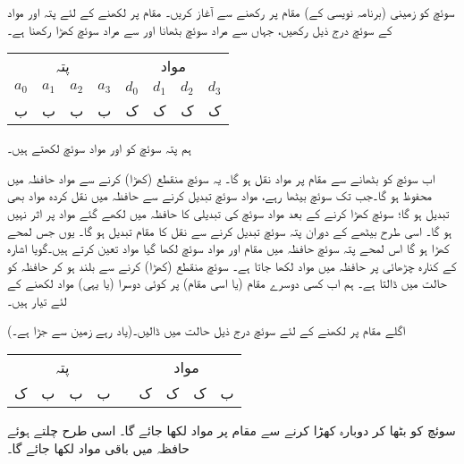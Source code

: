 سوئچ    کو زمینی (برنامہ نویسی کے) مقام  پر رکھنے سے آغاز کریں۔ مقام  پر   لکھنے کے لئے پتہ اور مواد کے سوئچ درج ذیل رکھیں، جہاں   سے مراد سوئچ بٹھانا اور  سے مراد سوئچ کھڑا رکھنا ہے۔
\begin{center}
\begin{tabular}{cccc|cccc}
\multicolumn{4}{c|}{پتہ}&\multicolumn{4}{c}{مواد}\\
$a_0$&$a_1$&$a_2$&$a_3$&$d_0$&$d_1$&$d_2$&$d_3$\\
\toprule
ب&ب&ب&ب&ک&ک&ک&ک
\end{tabular}
\end{center}
ہم پتہ سوئچ کو  اور مواد سوئچ  لکھتے ہیں۔

اب  سوئچ کو بٹھانے سے   مقام  پر مواد  نقل ہو گا۔ یہ سوئچ منقطع (کھڑا) کرنے سے مواد حافظہ میں  محفوظ ہو گا۔جب تک  سوئچ  بیٹھا رہے، مواد  سوئچ تبدیل کرنے سے   حافظہ میں  نقل کردہ مواد  بھی تبدیل ہو گا؛ سوئچ کھڑا کرنے  کے بعد مواد سوئچ کی تبدیلی کا حافظہ میں لکھے گئے مواد پر  اثر نہیں ہو گا۔ اسی طرح بیٹھے  کے دوران پتہ سوئچ تبدیل کرنے سے   نقل کا مقام تبدیل ہو گا۔ یوں جس لمحے  کھڑا ہو گا اس لمحے پتہ سوئچ   حافظہ میں مقام  اور مواد سوئچ  لکھا گیا مواد تعین کرتے ہیں۔گویا   اشارہ کے کنارہ چڑھائی پر  حافظہ میں مواد لکھا جاتا ہے۔ سوئچ  منقطع (کھڑا) کرنے   سے  بلند ہو کر حافظہ  کو     حالت میں ڈالتا ہے۔ ہم اب  کسی دوسرے مقام (یا اسی مقام) پر کوئی دوسرا (یا یہی) مواد لکھنے کے لئے تیار ہیں۔

اگلے مقام  پر   لکھنے کے لئے سوئچ درج ذیل حالت میں ڈالیں۔(یاد رہے  زمین سے جڑا ہے۔)
\begin{center}
\begin{tabular}{ccccccccc}
\multicolumn{4}{c}{پتہ}&\phantom{ک }&\multicolumn{4}{c}{مواد}\\[0.5ex]
ک&ب&ب&ب&&ک&ک&ک&ب
\end{tabular}
\end{center}
سوئچ  کو بٹھا کر  دوبارہ کھڑا کرنے سے مقام  پر مواد  لکھا جائے گا۔ اسی طرح  چلتے ہوئے حافظہ میں باقی مواد   لکھا جائے گا۔

